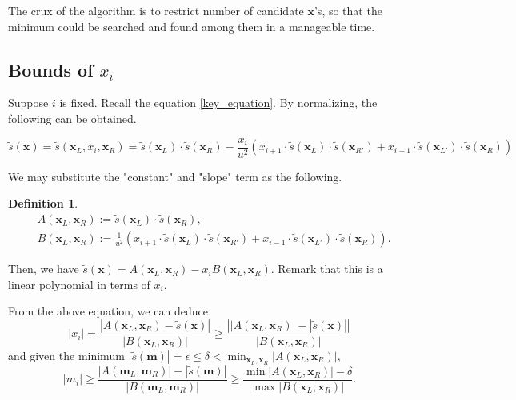 \documentclass{article}
\theoremstyle{definition}
\newtheorem*{definition}{Definition}
\theoremstyle{plain}
\theoremstyle{remark}
\numberwithin{equation}{section}
\newcommand{\abs}[1]{\left\lvert{#1}\right\rvert}
\begin{document}
The crux of the algorithm is to restrict number of candidate $\mathbf{x}$'s,
so that the minimum could be searched and found among them in a manageable time.

\subsection{Bounds of $x_i$}

\def\xs {\mathbf{x}}
\def\xsL {\mathbf{x}_L}
\def\xsR {\mathbf{x}_R}
\def\xsLl {\mathbf{x}_{L'}}
\def\xsRr {\mathbf{x}_{R'}}

Suppose $i$ is fixed.
Recall the equation \eqref{key_equation}.
By normalizing, the following can be obtained.

\[
  \tilde{s}(\xs) = \tilde{s}(\xsL, x_i, \xsR)
  = \tilde{s}(\xsL) \cdot \tilde{s}(\xsR)
  - \frac{x_i}{u^2}
  (x_{i+1} \cdot \tilde{s}(\xsL) \cdot \tilde{s}(\xsRr) + x_{i-1} \cdot \tilde{s}(\xsLl) \cdot \tilde{s}(\xsR))
\]

We may substitute the "constant" and "slope" term as the following.
\begin{definition}
  \begin{align*}
    & A(\xsL, \xsR) := \tilde{s}(\xsL) \cdot \tilde{s}(\xsR), \\
    & B(\xsL, \xsR) := \frac{1}{u^2}
    (x_{i+1} \cdot \tilde{s}(\xsL) \cdot \tilde{s}(\xsRr) + x_{i-1} \cdot \tilde{s}(\xsLl) \cdot \tilde{s}(\xsR)).
  \end{align*}
\end{definition}
Then, we have $\tilde{s}(\mathbf{x}) = A(\mathbf{x}_L, \mathbf{x}_R) - x_i B(\mathbf{x}_L, \mathbf{x}_R)$.
Remark that this is a linear polynomial in terms of $x_i$.

From the above equation, we can deduce
\[
  \abs{x_i} = \frac{\abs{A(\mathbf{x}_L, \mathbf{x}_R) - \tilde{s}(\mathbf{x})}}{\abs{B(\mathbf{x}_L, \mathbf{x}_R)}}
  \geq \frac{\abs{\abs{A(\mathbf{x}_L, \mathbf{x}_R)} - \abs{\tilde{s}(\mathbf{x})}}}{\abs{B(\mathbf{x}_L, \mathbf{x}_R)}}
\]
and given the minimum $\abs{\tilde{s}(\mathbf{m})} = \epsilon \leq \delta
< \min_{\mathbf{x}_L, \mathbf{x}_R} \abs{A(\mathbf{x}_L, \mathbf{x}_R)}$,
\begin{equation}\label{normal_key_condition}
  \abs{m_i}
  \geq \frac{\abs{A(\mathbf{m}_L, \mathbf{m}_R)} - \abs{\tilde{s}(\mathbf{m})}}{\abs{B(\mathbf{m}_L, \mathbf{m}_R)}}
  \geq \frac{\min \abs{A(\mathbf{x}_L, \mathbf{x}_R)} - \delta}{\max \abs{B(\mathbf{x}_L, \mathbf{x}_R)}}.
\end{equation}
\end{document}
